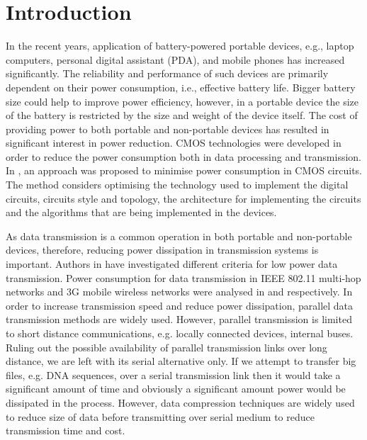 \documentclass[preprint,12pt]{elsarticle}
\begin{document}
\section{Introduction}
In the recent years, application of battery-powered portable devices, e.g., laptop computers, personal digital assistant (PDA),  and mobile phones has increased significantly. The reliability and performance of such devices are primarily dependent  on their power consumption, i.e., effective battery life. Bigger battery size could help to improve power efficiency, however, in a portable device the size of the battery is restricted by the size and weight of the device itself. The cost of providing power to both portable and non-portable devices has resulted in significant interest in power reduction. CMOS technologies were developed in order to reduce the power consumption both in data processing and transmission. In \cite{chandrakasan1995}, an approach was proposed to minimise power consumption in CMOS circuits. The method considers optimising the technology used to implement the digital circuits, circuits style and topology, the architecture for implementing the circuits and the algorithms that are being implemented in the devices.

As data transmission is a common operation in both portable and non-portable devices, therefore, reducing power dissipation in transmission systems is important. Authors in \cite{Gregori2004,Yates04} have investigated different criteria for low power data transmission. Power consumption for data transmission in IEEE 802.11 multi-hop networks and 3G mobile wireless networks were analysed in \cite{Le11} and \cite{toorisaka12} respectively.  In order to increase transmission speed and reduce power dissipation, parallel data transmission methods are widely used. However, parallel transmission is limited to short distance communications, e.g. locally connected devices, internal buses. Ruling out the possible availability of parallel transmission links over long distance, we are left with its serial alternative only. If we attempt to transfer big files, e.g. DNA sequences, over a serial transmission link then it would take a significant amount of time and obviously a significant amount power would be dissipated in the process. However, data compression techniques are widely used to reduce size of data before transmitting over serial medium to reduce transmission time and cost.
\end{document}
